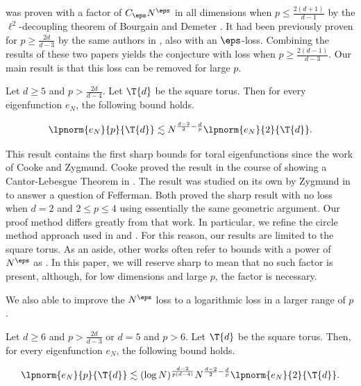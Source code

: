 \documentclass[11pt]{amsart}
\begin{document}
 was proven with a factor of $C_\eps N^\eps$ in all dimensions when $p\leq \frac{2(d+1)}{d-1}$ by the $\ell^2$-decoupling theorem of Bourgain and Demeter \cite{BourgainDemeter2015}. It had been previously proven for $p\geq \frac{2d}{d-3}$ by the same authors in \cite{bourgainDemeterDiscreteRestrictImprovements2013}, also with an $\eps$-loss. Combining the results of these two papers yields the conjecture with loss when $p\geq \frac{2(d-1)}{d-3}$. Our main result is that this loss can be removed for large $p$.

\begin{theorem}\label{1: SharpMainResultThm}
    Let $d\geq 5$ and $p>\frac{2d}{d-4}$. Let $\T{d}$ be the square torus. Then for every eigenfunction $e_N$, the following bound holds.

        \begin{equation}\label{1: DiscreteRestrictionEqn}
        \lpnorm{e_N}{p}{\T{d}}\lesssim N^{\frac{d-2}{2}-\frac{d}{p}}\lpnorm{e_N}{2}{\T{d}}.
    \end{equation}
\end{theorem}
This result contains the first sharp bounds for toral eigenfunctions since the work of Cooke and Zygmund. Cooke proved the result in the course of showing a Cantor-Lebesgue Theorem in \cite{cooke1971}. The result was studied on its own by Zygmund in \cite{Zygmund1974} to answer a question of Fefferman. Both proved the sharp result with no loss when $d=2$ and $2\leq p \leq 4$ using essentially the same geometric argument. Our proof method differs greatly from that work. In particular, we refine the circle method approach used in \cite{bourgainTorusEFunc1993} and \cite{bourgainDemeterDiscreteRestrictImprovements2013}. For this reason, our results are limited to the square torus. As an aside, other works often refer to bounds with a power of $N^\eps$ as . In this paper, we will reserve sharp to mean that no such factor is present, although, for low dimensions and large $p$, the factor is necessary.

We also able to improve the $N^\eps$ loss to a logarithmic loss in a larger range of $p$.

\begin{theorem}\label{1: logMainResultThm}
    Let $d\geq 6$ and $p>\frac{2d}{d-3}$ or $d=5$ and $p>6$. Let $\T{d}$ be the square torus. Then, for every eigenfunction $e_N$, the following bound holds.

        \begin{equation}\label{1: DiscreteRestrictionEqn}
        \lpnorm{e_N}{p}{\T{d}}\lesssim (\log N)^{\frac{d-2}{p(d-4)}}N^{\frac{d-2}{2}-\frac{d}{p}}\lpnorm{e_N}{2}{\T{d}}.
    \end{equation}
\end{theorem}
\end{document}
